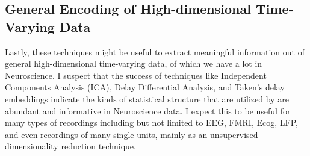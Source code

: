 \subsection{General Encoding of High-dimensional Time-Varying Data}
Lastly, these techniques might be useful to extract meaningful information out of general high-dimensional time-varying data, of which we have a lot in Neuroscience. I suspect that the success of techniques like Independent Components Analysis (ICA)\cite{ICA}, Delay Differential Analysis\cite{DDA}, and Taken's delay embeddings indicate the kinds of statistical structure that are utilized by \CPC are abundant and informative in Neuroscience data. I expect this to be useful for many types of recordings including but not limited to EEG, FMRI, Ecog, LFP, and even recordings of many single units, mainly as an unsupervised dimensionality reduction technique.